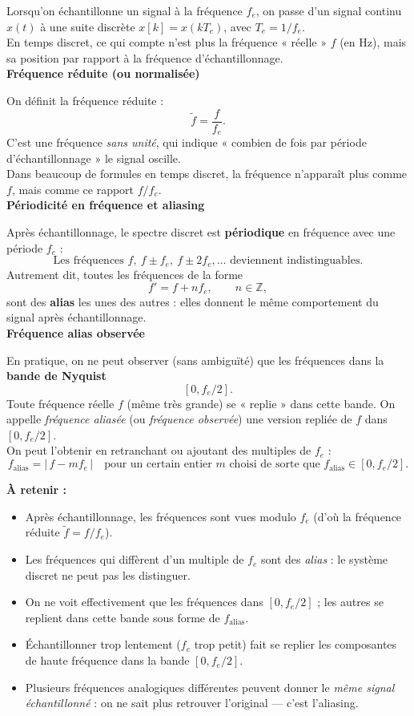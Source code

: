 Lorsqu’on échantillonne un signal à la fréquence $f_e$, on passe d’un signal continu $x(t)$ à une suite discrète $x[k] = x(kT_e)$, avec $T_e = 1/f_e$. \\

En temps discret, ce qui compte n’est plus la fréquence « réelle » $f$ (en Hz), mais sa position par rapport à la fréquence d’échantillonnage. \\

\textbf{Fréquence réduite (ou normalisée)}

On définit la fréquence réduite :
\[
\tilde f = \frac{f}{f_e}.
\]
C’est une fréquence \emph{sans unité}, qui indique « combien de fois par période d’échantillonnage » le signal oscille. \\

Dans beaucoup de formules en temps discret, la fréquence n’apparaît plus comme $f$, mais comme ce rapport $f/f_e$. \\

\textbf{Périodicité en fréquence et aliasing}

Après échantillonnage, le spectre discret est \textbf{périodique} en fréquence avec une période $f_e$ :
\[
\text{Les fréquences } f,\ f \pm f_e,\ f \pm 2f_e,\dots \text{ deviennent indistinguables.}
\]
Autrement dit, toutes les fréquences de la forme
\[
f' = f + n f_e,\qquad n\in\mathbb{Z},
\]
sont des \textbf{alias} les unes des autres : elles donnent le même comportement du signal après échantillonnage. \\

\textbf{Fréquence alias observée}

En pratique, on ne peut observer (sans ambiguïté) que les fréquences dans la \textbf{bande de Nyquist}
\[
[0, f_e/2].
\]
Toute fréquence réelle $f$ (même très grande) se « replie » dans cette bande. On appelle
\emph{fréquence aliasée} (ou \emph{fréquence observée}) une version repliée de $f$ dans $[0, f_e/2]$. \\

On peut l’obtenir en retranchant ou ajoutant des multiples de $f_e$ :
\[
f_{\text{alias}} = |\, f - m f_e \,| \quad \text{pour un certain entier $m$ choisi de sorte que } f_{\text{alias}} \in [0, f_e/2].
\]

\textbf{À retenir :}
\begin{itemize}
    \item Après échantillonnage, les fréquences sont vues modulo $f_e$ (d’où la fréquence réduite $\tilde f = f/f_e$).
    \item Les fréquences qui diffèrent d’un multiple de $f_e$ sont des \emph{alias} : le système discret ne peut pas les distinguer.
    \item On ne voit effectivement que les fréquences dans $[0,f_e/2]$ ; les autres se replient dans cette bande sous forme de $f_{\text{alias}}$.
    \item Échantillonner trop lentement ($f_e$ trop petit) fait se replier les composantes de haute fréquence dans la bande $[0, f_e/2]$.
    \item Plusieurs fréquences analogiques différentes peuvent donner le \emph{même signal échantillonné} : on ne sait plus retrouver l’original — c’est l'aliasing.
\end{itemize}

